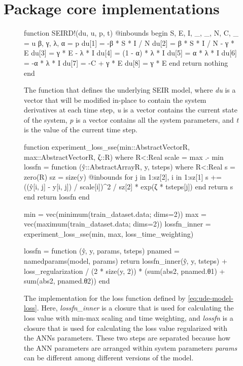 \chapter{Package core implementations}

\begin{figure}[!htb]
\centering
\begin{jllisting}
function SEIRD!(du, u, p, t)
    @inbounds begin
        S, E, I, _, _, N, C, _ = u
        β, γ, λ, α = p
        du[1] = -β * S * I / N
        du[2] = β * S * I / N - γ * E
        du[3] = γ * E - λ * I
        du[4] = (1 - α) * λ * I
        du[5] = α * λ * I
        du[6] = -α * λ * I
        du[7] = -C + γ * E
        du[8] = γ * E
    end
    return nothing
end
\end{jllisting}
\caption{The function that defines the underlying SEIR model, where \textit{du} is a vector that will be modified in-place to contain the system derivatives at each time step, \textit{u} is a vector contains the current state of the system, \textit{p} is a vector contains all the system parameters, and \textit{t} is the value of the current time step.}
\label{fig:diffeq-seird-inplace}
\end{figure}

\begin{figure}[!htb]
\begin{jllisting}
function experiment_loss_sse(min::AbstractVector{R},
                             max::AbstractVector{R},
                             ζ::R) where {R<:Real}
    scale = max .- min
    lossfn = function (ŷ::AbstractArray{R}, y, tsteps) where {R<:Real}
        s = zero(R)
        sz = size(y)
        @inbounds for j in 1:sz[2], i in 1:sz[1]
            s += ((ŷ[i, j] - y[i, j]) / scale[i])^2 / sz[2] * exp(ζ * tsteps[j])
        end
        return s
    end
    return lossfn
end

min = vec(minimum(train_dataset.data; dims=2))
max = vec(maximum(train_dataset.data; dims=2))
lossfn_inner = experiment_loss_sse(min, max, loss_time_weighting)

lossfn = function (ŷ, y, params, tsteps)
    pnamed = namedparams(model, params)
    return lossfn_inner(ŷ, y, tsteps) +
            loss_regularization / (2 * size(y, 2)) *
            (sum(abs2, pnamed.θ1) + sum(abs2, pnamed.θ2))
end
\end{jllisting}
\caption{The implementation for the loss function defined by \autoref{eq:ude-model-loss}. Here, \textit{lossfn\_inner} is a closure that is used for calculating the loss value with min-max scaling and time weighting, and \textit{lossfn} is a closure that is used for calculating the loss value regularized with the \glspl{ANN} parameters. These two steps are separated because how the \gls{ANN} parameters are arranged within system parameters \textit{params} can be different among different versions of the model.}
\label{fig:diffeq-seird-experiment-loss}
\end{figure}

